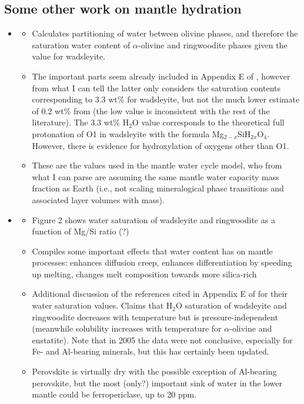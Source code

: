 \documentclass{article}
\begin{document}
\subsection{Some other work on mantle hydration}

\begin{itemize}

\item \citet{2010PEPI..183..245I}
\begin{itemize}
\item Calculates partitioning of water between olivine phases, and therefore the saturation water content of $\alpha$-olivine and ringwoodite phases given the value for wadsleyite.
\item The important parts seem already included in Appendix E of \citet{shahInternalWaterStorage2021}, however from what I can tell the latter only considers the saturation contents corresponding to 3.3 wt\% for wadsleyite, but not the much lower estimate of 0.2 wt\% from \citet{daiElectricalConductivityWadsleyite2009} (the low value is inconsistent with the rest of the literature). The 3.3 wt\% H$_2$O value corresponds to the theoretical full protonation of O1 in wadsleyite with the formula Mg$_{2-x}$SiH$_{2x}$O$_4$. However, there is evidence for hydroxylation of oxygens other than O1.
\item These are the values used in the \citet{cowanWATERCYCLINGOCEAN2014} mantle water cycle model, who from what I can parse are assuming the same mantle water capacity mass fraction as Earth (i.e., not scaling mineralogical phase transitions and associated layer volumes with mass).
\end{itemize}

\item \citet{bolfan-casanovaWaterEarthMantle2005}
\begin{itemize}
\item Figure 2 shows water saturation of wadsleyite and ringwoodite as a function of Mg/Si ratio (?)
\item Compiles some important effects that water content has on mantle processes: enhances diffusion creep, enhances differentiation by speeding up melting, changes melt composition towards more silica-rich
\item Additional discussion of the references cited in Appendix E of \citet{shahInternalWaterStorage2021} for their water saturation values. Claims that H$_2$O saturation of wadsleyite and ringwoodite decreases with temperature but is pressure-independent (meanwhile solubility increases with temperature for $\alpha$-olivine and enstatite). Note that in 2005 the data were not conclusive, especially for Fe- and Al-bearing minerals, but this has certainly been updated.
\item Perovskite is virtually dry with the possible exception of Al-bearing perovskite, but the most (only?) important sink of water in the lower mantle could be ferropericlase, up to 20 ppm.
\end{itemize}

\end{itemize}
\end{document}
